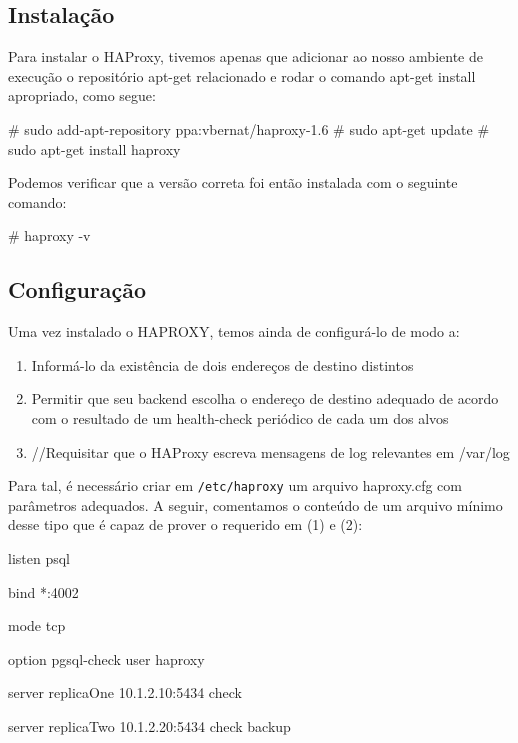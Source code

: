 \documentclass[a4paper,10pt]{article}
\begin{document}
    \subsection{Instalação}

        Para instalar o HAProxy, tivemos apenas que adicionar ao nosso ambiente de execução o repositório apt-get relacionado e rodar o comando apt-get install apropriado, como segue:

        \begin{spverbatim}
        # sudo add-apt-repository ppa:vbernat/haproxy-1.6
        # sudo apt-get update
        # sudo apt-get install haproxy
        \end{spverbatim}

        Podemos verificar que a versão correta foi então instalada com o seguinte comando:

       \begin{spverbatim}
        # haproxy -v
        \end{spverbatim}

    \subsection{Configuração}

        Uma vez instalado o HAPROXY, temos ainda de configurá-lo de modo a:

        \begin{enumerate}
        \item Informá-lo da existência de dois endereços de destino distintos
        \item Permitir que seu backend escolha o endereço de destino adequado de acordo com o resultado de um health-check periódico de cada um dos alvos
        \item //Requisitar que o HAProxy escreva mensagens de log relevantes em /var/log
        \end{enumerate}

        Para tal, é necessário criar em \verb|/etc/haproxy| um arquivo haproxy.cfg com parâmetros adequados.
        A seguir, comentamos o conteúdo de um arquivo mínimo desse tipo que é capaz de prover o requerido em (1) e (2):

       \begin{spverbatim}
        listen psql

       bind    *:4002

       mode  tcp

       option  pgsql-check user haproxy

       server  replicaOne  10.1.2.10:5434 check

       server  replicaTwo  10.1.2.20:5434 check backup
        \end{spverbatim}
\end{document}
